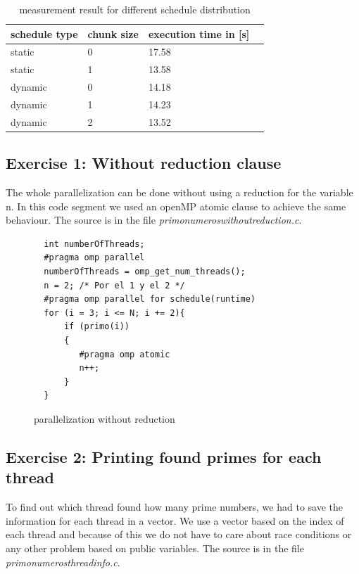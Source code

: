 \documentclass[11pt,a4paper]{article}
\begin{document}
\begin{table}[h]
\centering
\label{table_scheduledistribution}
\begin{tabular}{| l | l | l | l |}
    \hline
    schedule type & chunk size & execution time in [s]\\ 
    \hline
	static & 0 & 17.58 \\
	\hline
	static & 1 & 13.58 \\
    \hline
	dynamic & 0 & 14.18 \\
    \hline
    dynamic & 1 & 14.23 \\
    \hline
    dynamic & 2 & 13.52 \\
    \hline
\end{tabular}
\caption{measurement result for different schedule distribution}
\end{table}

\subsection{Exercise 1: Without reduction clause}
\label{ex21}

The whole parallelization can be done without using a reduction for the variable n. In this code segment we used an openMP atomic clause to achieve the same behaviour.
The source is in the file \textit{primo\textunderscore numeros\textunderscore without\textunderscore reduction.c}.

\begin{figure}[h]
\label{code_withoutreduction}
\begin{lstlisting}
  int numberOfThreads;
  #pragma omp parallel
  numberOfThreads = omp_get_num_threads();
  n = 2; /* Por el 1 y el 2 */
  #pragma omp parallel for schedule(runtime)
  for (i = 3; i <= N; i += 2){
      if (primo(i))
      {
         #pragma omp atomic
         n++;
      }
  }
\end{lstlisting} 
\caption{parallelization without reduction}
\end{figure}

\pagebreak

\subsection{Exercise 2: Printing found primes for each thread}
\label{ex22}

To find out which thread found how many prime numbers, we had to save the information for each thread in a vector. We use a vector based on the index of each thread and because of this we do not have to care about race conditions or any other problem based on public variables.
The source is in the file \textit{primo\textunderscore numeros\textunderscore threadinfo.c}.
\end{document}
